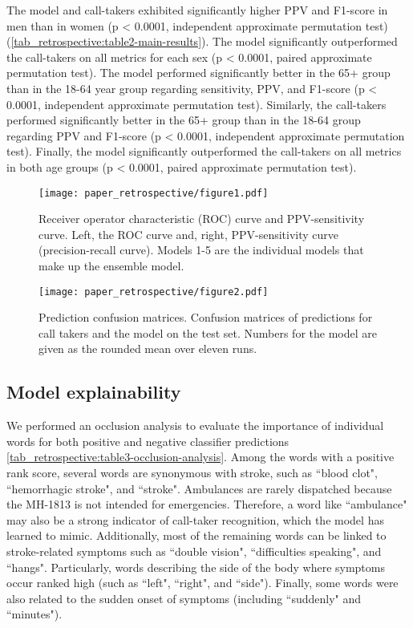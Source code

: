 {The model and call-takers exhibited significantly higher PPV and F1-score in men than in women (p < 0.0001, independent approximate permutation test) (\cref{tab_retrospective:table2-main-results}). The model significantly outperformed the call-takers on all metrics for each sex (p < 0.0001, paired approximate permutation test).
The model performed significantly better in the 65+ group than in the 18-64 year group regarding sensitivity, PPV, and F1-score (p < 0.0001, independent approximate permutation test). Similarly, the call-takers performed significantly better in the 65+ group than in the 18-64 group regarding PPV and F1-score (p < 0.0001, independent approximate permutation test). Finally, the model significantly outperformed the call-takers on all metrics in both age groups (p < 0.0001, paired approximate permutation test).

\begin{figure}[t]
    \centering
    \texttt{[image: paper\_retrospective/figure1.pdf]}
    \caption[ROC- and PPV-sensitivity curves for stroke recognition model.]{Receiver operator characteristic (ROC) curve and PPV-sensitivity curve. Left, the ROC curve and, right, PPV-sensitivity curve (precision-recall curve). Models 1-5 are the individual models that make up the ensemble model.}
    \label{fig_retrospective:figure1-roc-curve}
\end{figure}

\begin{figure}[t]
    \centering
    \texttt{[image: paper\_retrospective/figure2.pdf]}
    \caption[Prediction confusion matrices for stroke recognition.]{Prediction confusion matrices. Confusion matrices of predictions for call takers and the model on the test set. Numbers for the model are given as the rounded mean over eleven runs.}
    \label{fig_retrospective:figure2-prediction-confusion-matrices}
\end{figure}


\subsection{Model explainability}

We performed an occlusion analysis to evaluate the importance of individual words for both positive and negative classifier predictions \cref{tab_retrospective:table3-occlusion-analysis}. 
Among the words with a positive rank score, several words are synonymous with stroke, such as ``blood clot", ``hemorrhagic stroke", and ``stroke". Ambulances are rarely dispatched because the MH-1813 is not intended for emergencies. Therefore, a word like ``ambulance" may also be a strong indicator of call-taker recognition, which the model has learned to mimic. Additionally, most of the remaining words can be linked to stroke-related symptoms such as ``double vision", ``difficulties speaking", and ``hangs". Particularly, words describing the side of the body where symptoms occur ranked high (such as ``left", ``right", and ``side"). Finally, some words were also related to the sudden onset of symptoms (including ``suddenly" and ``minutes").

}

